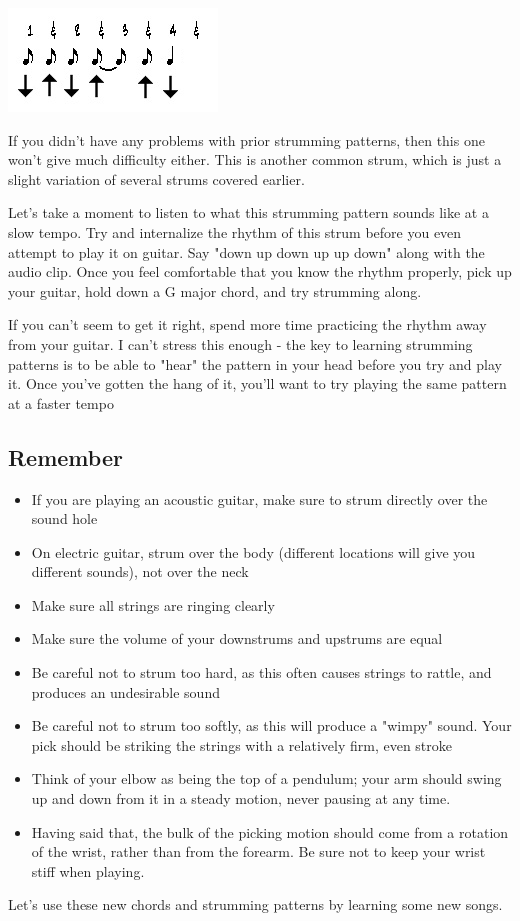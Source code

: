 \includegraphics{partsix/strum5.png}

If you didn't have any problems with prior strumming patterns, then this one won't give much difficulty either. This is another common strum, which is just a slight variation of several strums covered earlier.

Let's take a moment to listen to what this strumming pattern sounds like at a slow tempo. Try and internalize the rhythm of this strum before you even attempt to play it on guitar. Say "down up down up up down" along with the audio clip. Once you feel comfortable that you know the rhythm properly, pick up your guitar, hold down a G major chord, and try strumming along.

If you can't seem to get it right, spend more time practicing the rhythm away from your guitar. I can't stress this enough - the key to learning strumming patterns is to be able to "hear" the pattern in your head before you try and play it. Once you've gotten the hang of it, you'll want to try playing the same pattern at a faster tempo 

\subsection{Remember}
\begin{itemize}
\item If you are playing an acoustic guitar, make sure to strum directly over the sound hole
\item On electric guitar, strum over the body (different locations will give you different sounds), not over the neck
\item Make sure all strings are ringing clearly
\item Make sure the volume of your downstrums and upstrums are equal
\item Be careful not to strum too hard, as this often causes strings to rattle, and produces an undesirable sound
\item Be careful not to strum too softly, as this will produce a "wimpy" sound. Your pick should be striking the strings with a relatively firm, even stroke
\item Think of your elbow as being the top of a pendulum; your arm should swing up and down from it in a steady motion, never pausing at any time.
\item Having said that, the bulk of the picking motion should come from a rotation of the wrist, rather than from the forearm. Be sure not to keep your wrist stiff when playing. 
\end{itemize}
Let's use these new chords and strumming patterns by learning some new songs. 

